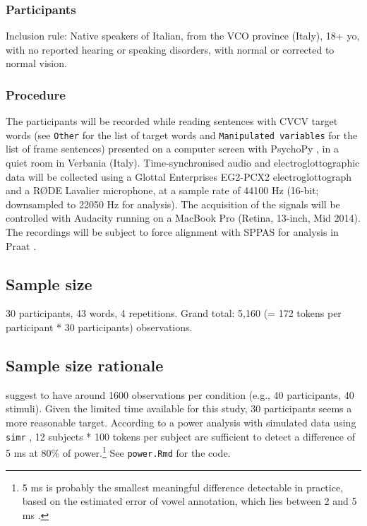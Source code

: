 \documentclass[11pt,]{article}
\let\rmarkdownfootnote\footnote%
\def\footnote{\protect\rmarkdownfootnote}
\begin{document}
\hypertarget{participants}{%
\subsubsection{Participants}\label{participants}}

Inclusion rule: Native speakers of Italian, from the VCO province
(Italy), 18+ yo, with no reported hearing or speaking disorders, with
normal or corrected to normal vision.

\hypertarget{procedure}{%
\subsubsection{Procedure}\label{procedure}}

The participants will be recorded while reading sentences with CVCV
target words (see \texttt{Other} for the list of target words and
\texttt{Manipulated\ variables} for the list of frame sentences)
presented on a computer screen with PsychoPy \citep{peirce2009}, in a
quiet room in Verbania (Italy). Time-synchronised audio and
electroglottographic data will be collected using a Glottal Enterprises
EG2-PCX2 electroglottograph and a RØDE Lavalier microphone, at a sample
rate of 44100 Hz (16-bit; downsampled to 22050 Hz for analysis). The
acquisition of the signals will be controlled with Audacity running on a
MacBook Pro (Retina, 13-inch, Mid 2014). The recordings will be subject
to force alignment with SPPAS \citep{bigi2015} for analysis in Praat
\citep{boersma2018}.

\hypertarget{sample-size}{%
\subsection{Sample size}\label{sample-size}}

30 participants, 43 words, 4 repetitions. Grand total: 5,160 (= 172
tokens per participant * 30 participants) observations.

\hypertarget{sample-size-rationale}{%
\subsection{Sample size rationale}\label{sample-size-rationale}}

\citet{brysbaert2018} suggest to have around 1600 observations per
condition (e.g., 40 participants, 40 stimuli). Given the limited time
available for this study, 30 participants seems a more reasonable
target. According to a power analysis with simulated data using
\texttt{simr} \citep{green2016}, 12 subjects * 100 tokens per subject
are sufficient to detect a difference of 5 ms at 80\% of
power.\footnote{5 ms is probably the smallest meaningful difference detectable in practice, based on the estimated error of vowel annotation, which lies between 2 and 5 ms \citep{allen1978}.}
See \texttt{power.Rmd} for the code.
\end{document}
